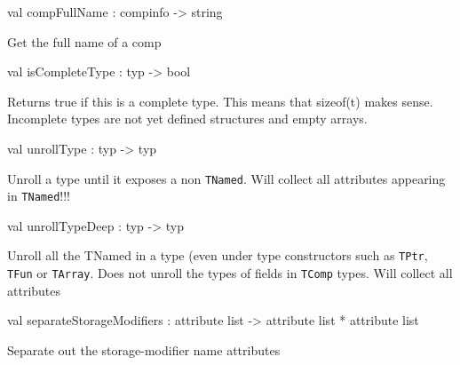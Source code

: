 \documentclass[11pt]{article}
\begin{document}
\label{val:Cil.compFullName}\begin{ocamldoccode}
val compFullName : compinfo -> string
\end{ocamldoccode}
\begin{ocamldocdescription}
Get the full name of a comp


\end{ocamldocdescription}




\label{val:Cil.isCompleteType}\begin{ocamldoccode}
val isCompleteType : typ -> bool
\end{ocamldoccode}
\begin{ocamldocdescription}
Returns true if this is a complete type. 
   This means that sizeof(t) makes sense. 
   Incomplete types are not yet defined 
   structures and empty arrays.


\end{ocamldocdescription}




\label{val:Cil.unrollType}\begin{ocamldoccode}
val unrollType : typ -> typ
\end{ocamldoccode}
\begin{ocamldocdescription}
Unroll a type until it exposes a non 
 {\tt{TNamed}}. Will collect all attributes appearing in {\tt{TNamed}}!!!


\end{ocamldocdescription}




\label{val:Cil.unrollTypeDeep}\begin{ocamldoccode}
val unrollTypeDeep : typ -> typ
\end{ocamldoccode}
\begin{ocamldocdescription}
Unroll all the TNamed in a type (even under type constructors such as 
 {\tt{TPtr}}, {\tt{TFun}} or {\tt{TArray}}. Does not unroll the types of fields in {\tt{TComp}} 
 types. Will collect all attributes


\end{ocamldocdescription}




\label{val:Cil.separateStorageModifiers}\begin{ocamldoccode}
val separateStorageModifiers :
  attribute list -> attribute list * attribute list
\end{ocamldoccode}
\begin{ocamldocdescription}
Separate out the storage-modifier name attributes


\end{ocamldocdescription}
\end{document}

